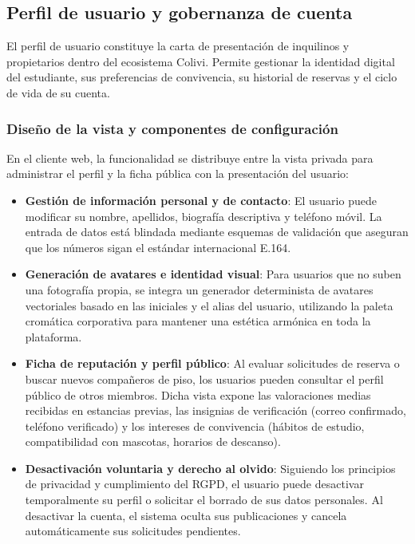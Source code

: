 \subsection{Perfil de usuario y gobernanza de cuenta}
\label{subsec:perfil_usuario}

El perfil de usuario constituye la carta de presentación de inquilinos y propietarios dentro del ecosistema Colivi. Permite gestionar la identidad digital del estudiante, sus preferencias de convivencia, su historial de reservas y el ciclo de vida de su cuenta.

\subsubsection{Diseño de la vista y componentes de configuración}

En el cliente web, la funcionalidad se distribuye entre la vista privada para administrar el perfil y la ficha pública con la presentación del usuario:

\begin{itemize}
    \item \textbf{Gestión de información personal y de contacto}: El usuario puede modificar su nombre, apellidos, biografía descriptiva y teléfono móvil. La entrada de datos está blindada mediante esquemas de validación que aseguran que los números sigan el estándar internacional E.164.
    \item \textbf{Generación de avatares e identidad visual}: Para usuarios que no suben una fotografía propia, se integra un generador determinista de avatares vectoriales basado en las iniciales y el alias del usuario, utilizando la paleta cromática corporativa para mantener una estética armónica en toda la plataforma.
    \item \textbf{Ficha de reputación y perfil público}: Al evaluar solicitudes de reserva o buscar nuevos compañeros de piso, los usuarios pueden consultar el perfil público de otros miembros. Dicha vista expone las valoraciones medias recibidas en estancias previas, las insignias de verificación (correo confirmado, teléfono verificado) y los intereses de convivencia (hábitos de estudio, compatibilidad con mascotas, horarios de descanso).
    \item \textbf{Desactivación voluntaria y derecho al olvido}: Siguiendo los principios de privacidad y cumplimiento del RGPD, el usuario puede desactivar temporalmente su perfil o solicitar el borrado de sus datos personales. Al desactivar la cuenta, el sistema oculta sus publicaciones y cancela automáticamente sus solicitudes pendientes.
\end{itemize}

